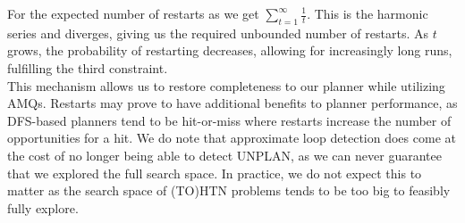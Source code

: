 For the expected number of restarts as we get $\sum_{t = 1}^\infty \frac{1}{t}$. This is the harmonic series and diverges, giving us the required unbounded number of restarts. As $t$ grows, the probability of restarting decreases, allowing for increasingly long runs, fulfilling the third constraint. \\
This mechanism allows us to restore completeness to our planner while utilizing AMQs. Restarts may prove to have additional benefits to planner performance, as DFS-based planners tend to be hit-or-miss where restarts increase the number of opportunities for a hit. We do note that approximate loop detection does come at the cost of no longer being able to detect UNPLAN, as we can never guarantee that we explored the full search space. In practice, we do not expect this to matter as the search space of (TO)HTN problems tends to be too big to feasibly fully explore.
\begin{comment}
- false positives mean we loose completeness
- i.e. if we perform progression search and $p = p_0, \ldots, p_n$ defines a path of search nodes from initial node to goal
- then for any $p_i$ in $p$, search nodes $p_0, \ldots, p_{i-1}$ may collectively set the $k$ hashes produced by $p_i$, filtering it out
- the chance of all paths to a goal node being filtered out as false positives only increases with each path we wrongly explore
- overall, we loose completeness

- one way to get completeness back: restarts while changing the seeds of the hash function
- assuming perfect hashing, for different seeds our hashes are completely uncorrelated
- as the number of restarts increases, the chance of encountering a false positive on the path start - goal every single time goes to zero
- only an infinite number of restarts as runtime goes to infinity does guarantee us this property
- we need arbitrarily long runs in between restarts, as plans may be arbitrarily long
- to be precise, we could limit plan length by the combination of maximum depth before a plan must exist (if it does at all) and maximum expansion factor (i.e. max. number of children of any task)
- simply allowing runs of any length simplifies the implementation, though
- we choose to check for a restart each second and, at second $t$, do it with probability $1 / t$
- for expected number of restarts we get $\sum_{t=1}^{\infty} \frac{1}{t}$
- this is a geometric series which diverges
- average time between restarts increases as time progresses
- both properties are what we want!
\end{comment}

